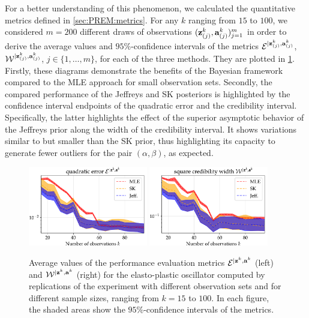 For a better understanding of this phenomenon, we calculated the quantitative metrics defined in \cref{sec:PREM:metrics}. For any $k$ ranging from $15$ to $100$, we considered $m=200$ different draws of observations $(\mathbf{z}^k_{(j)},\mathbf{a}^{k}_{(j)})_{j=1}^m$ in order to derive the average values and $95\%$-confidence intervals of the metrics $\mathcal{E}^{|\mathbf{z}^k_{(j)},\mathbf{a}^k_{(j)}}$, $\mathcal{W}^{|\mathbf{z}^k_{(j)},\mathbf{a}^k_{(j)}}$, $j\in\{1,\dots,m\}$, for each of the three methods. %
They are plotted in \cref{fig:errors}. Firstly, these diagrams demonstrate the benefits of the Bayesian framework compared to the MLE approach for small observation sets. Secondly, the compared performance of the Jeffreys and SK posteriors is highlighted by the confidence interval endpoints of the quadratic error and the credibility interval. Specifically, the latter highlights the effect of the superior asymptotic behavior of the Jeffreys prior along the width of the credibility interval. It shows variations similar to but smaller than the SK prior, thus highlighting its capacity to generate fewer outliers for the pair $(\alpha, \beta)$, as expected.

\begin{figure}[h]
    \centering%
    \includegraphics[width=5.2cm]{figures/PREM/oscill/errElog.pdf}\hspace*{0.5cm}
    \includegraphics[width=5.2cm]{figures/PREM/oscill/errWlog.pdf}
    \caption{%
    Average values of the performance evaluation metrics $\mathcal{E}^{|\mathbf{z}^k,\mathbf{a}^k}$ (left) and $\mathcal{W}^{|\mathbf{z}^k,\mathbf{a}^k}$ (right) for the elasto-plastic oscillator computed by replications of the experiment with different observation sets and for different sample sizes, ranging from $k=15$ to $100$. In each figure, the shaded areas show the $95\%$-confidence intervals of the metrics.}
    \label{fig:errors}
\end{figure}





